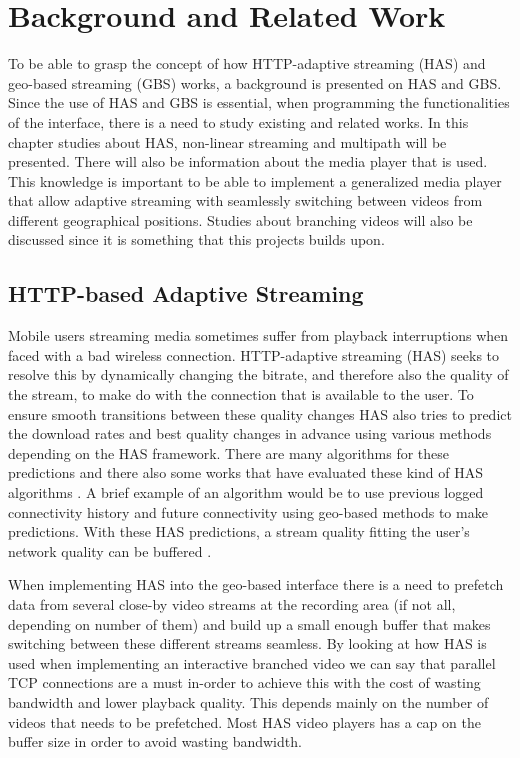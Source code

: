 \chapter{Background and Related Work}
\label{cha:theory}

To be able to grasp the concept of how HTTP-adaptive streaming (HAS) and geo-based streaming (GBS) works, a background is presented on HAS and GBS. Since the use of HAS and GBS is essential, when programming the functionalities of the interface, there is a need to study existing and related works. In this chapter studies about HAS, non-linear streaming and multipath will be presented. There will also be information about the media player that is used. This knowledge is important to be able to implement a generalized media player that allow adaptive streaming with seamlessly switching between videos from different geographical positions. Studies about branching videos will also be discussed since it is something that this projects builds upon.

\section{HTTP-based Adaptive Streaming}
\label{sec:has}

Mobile users streaming media sometimes suffer from playback interruptions when faced with a bad wireless connection. HTTP-adaptive streaming (HAS) seeks to resolve this by dynamically changing the bitrate, and therefore also the quality of the stream, to make do with the connection that is available to the user. To ensure smooth transitions between these quality changes HAS also tries to predict the download rates and best quality changes in advance using various methods depending on the HAS framework. There are many algorithms for these predictions and there also some works that have evaluated these kind of HAS algorithms \cite{hastohelp}. A brief example of an algorithm would be to use previous logged connectivity history and future connectivity using geo-based methods to make predictions. With these HAS predictions, a stream quality fitting the user’s network quality can be buffered \cite{gtube}.

When implementing HAS into the geo-based interface there is a need to prefetch data from several close-by video streams at the recording area (if not all, depending on number of them) and build up a small enough buffer that makes switching between these different streams seamless. By looking at how HAS is used when implementing an interactive branched video we can say that parallel TCP connections are a must in-order to achieve this with the cost of wasting bandwidth and lower playback quality. This depends mainly on the number of videos that needs to be prefetched. Most HAS video players has a cap on the buffer size in order to avoid wasting bandwidth. 

